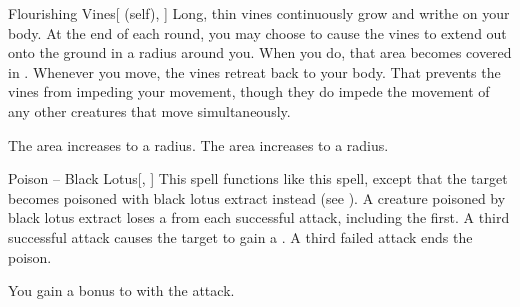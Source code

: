 \lowercase{\hypertarget{spell:Flourishing Vines}{}}\label{spell:Flourishing Vines}
\begin{attuneability}[Rank 4]{\hypertarget{spell:Flourishing Vines}{Flourishing Vines}}[ (self), ]
Long, thin vines continuously grow and writhe on your body.
At the end of each round, you may choose to cause the vines to extend out onto the ground in a \areamed radius around you.
When you do, that area becomes covered in .
Whenever you move, the vines retreat back to your body.
That prevents the vines from impeding your movement, though they do impede the movement of any other creatures that move simultaneously.

\rankline
{} The area increases to a \arealarge radius.
 The area increases to a \areahuge radius.
\end{attuneability}
\vspace{0.25em}



\lowercase{\hypertarget{spell:Poison -- Black Lotus}{}}\label{spell:Poison -- Black Lotus}
\begin{freeability}[Rank 4]{\hypertarget{spell:Poison -- Black Lotus}{Poison -- Black Lotus}}[, ]
This spell functions like this  spell, except that the target becomes poisoned with black lotus extract instead (see ).
A creature poisoned by black lotus extract loses a  from each successful attack, including the first.
A third successful attack causes the target to gain a .
A third failed attack ends the poison.

\rankline
{} You gain a  bonus to  with the attack.
\end{freeability}
\vspace{0.25em}



